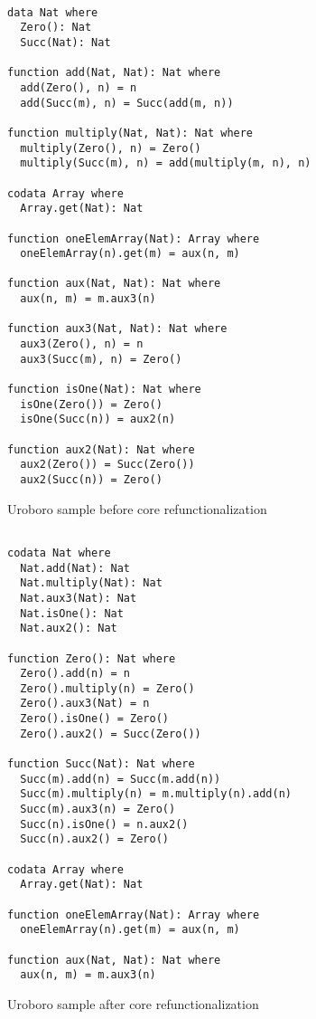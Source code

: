 \begin{figure}
\begin{lstlisting}

data Nat where
  Zero(): Nat
  Succ(Nat): Nat

function add(Nat, Nat): Nat where
  add(Zero(), n) = n
  add(Succ(m), n) = Succ(add(m, n))

function multiply(Nat, Nat): Nat where
  multiply(Zero(), n) = Zero()
  multiply(Succ(m), n) = add(multiply(m, n), n)

codata Array where
  Array.get(Nat): Nat

function oneElemArray(Nat): Array where
  oneElemArray(n).get(m) = aux(n, m)

function aux(Nat, Nat): Nat where
  aux(n, m) = m.aux3(n)

function aux3(Nat, Nat): Nat where
  aux3(Zero(), n) = n
  aux3(Succ(m), n) = Zero()

function isOne(Nat): Nat where
  isOne(Zero()) = Zero()
  isOne(Succ(n)) = aux2(n)

function aux2(Nat): Nat where
  aux2(Zero()) = Succ(Zero())
  aux2(Succ(n)) = Zero()

\end{lstlisting}
\caption{Uroboro sample before core refunctionalization}
\label{fig:ch4urosampleprerefunc}
\end{figure}

\begin{figure}
\begin{lstlisting}

codata Nat where
  Nat.add(Nat): Nat
  Nat.multiply(Nat): Nat
  Nat.aux3(Nat): Nat
  Nat.isOne(): Nat
  Nat.aux2(): Nat

function Zero(): Nat where
  Zero().add(n) = n
  Zero().multiply(n) = Zero()
  Zero().aux3(Nat) = n
  Zero().isOne() = Zero()
  Zero().aux2() = Succ(Zero())

function Succ(Nat): Nat where
  Succ(m).add(n) = Succ(m.add(n))
  Succ(m).multiply(n) = m.multiply(n).add(n)
  Succ(m).aux3(n) = Zero()
  Succ(n).isOne() = n.aux2()
  Succ(n).aux2() = Zero()

codata Array where
  Array.get(Nat): Nat

function oneElemArray(Nat): Array where
  oneElemArray(n).get(m) = aux(n, m)

function aux(Nat, Nat): Nat where
  aux(n, m) = m.aux3(n)

\end{lstlisting}
\caption{Uroboro sample after core refunctionalization}
\label{fig:ch4urosamplepostrefunc}
\end{figure}

